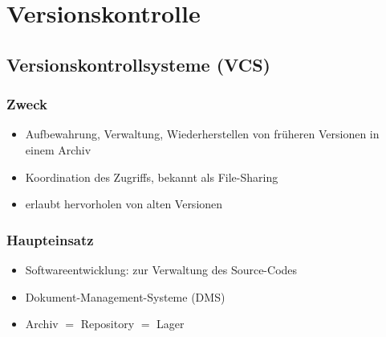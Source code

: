 \section{Versionskontrolle}
\subsection{Versionskontrollsysteme (VCS)}

\begin{multicols}{2}
	\subsubsection{Zweck}
	\begin{itemize}
		\item Aufbewahrung, Verwaltung, Wiederherstellen von früheren Versionen in einem Archiv
		\item Koordination des Zugriffs, bekannt als File-Sharing
		\item erlaubt hervorholen von alten Versionen
	\end{itemize}
	
	\subsubsection{Haupteinsatz}
	\begin{itemize}
		\item Softwareentwicklung: zur Verwaltung des Source-Codes
		\item Dokument-Management-Systeme (DMS)
		\item Archiv $=$ Repository $=$ Lager
	\end{itemize}
\end{multicols}

